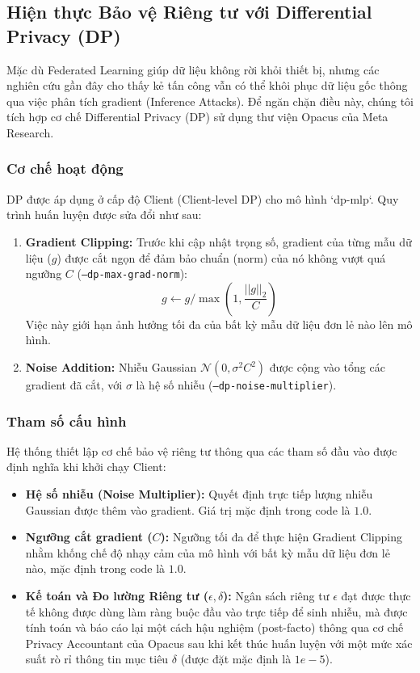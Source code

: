 \subsection{Hiện thực Bảo vệ Riêng tư với Differential Privacy (DP)}

Mặc dù Federated Learning giúp dữ liệu không rời khỏi thiết bị, nhưng các nghiên cứu gần đây cho thấy kẻ tấn công vẫn có thể khôi phục dữ liệu gốc thông qua việc phân tích gradient (Inference Attacks). Để ngăn chặn điều này, chúng tôi tích hợp cơ chế Differential Privacy (DP) sử dụng thư viện Opacus của Meta Research.

\subsubsection{Cơ chế hoạt động}
DP được áp dụng ở cấp độ Client (Client-level DP) cho mô hình `dp-mlp`. Quy trình huấn luyện được sửa đổi như sau:
\begin{enumerate}
    \item \textbf{Gradient Clipping:} Trước khi cập nhật trọng số, gradient của từng mẫu dữ liệu ($g$) được cắt ngọn để đảm bảo chuẩn (norm) của nó không vượt quá ngưỡng $C$ (\texttt{--dp-max-grad-norm}):
    $$g \leftarrow g / \max(1, \frac{||g||_2}{C})$$
    Việc này giới hạn ảnh hưởng tối đa của bất kỳ mẫu dữ liệu đơn lẻ nào lên mô hình.
    
    \item \textbf{Noise Addition:} Nhiễu Gaussian $\mathcal{N}(0, \sigma^2C^2)$ được cộng vào tổng các gradient đã cắt, với $\sigma$ là hệ số nhiễu (\texttt{--dp-noise-multiplier}).
\end{enumerate}



\subsubsection{Tham số cấu hình}
Hệ thống thiết lập cơ chế bảo vệ riêng tư thông qua các tham số đầu vào được định nghĩa khi khởi chạy Client:

\begin{itemize}
    \item \textbf{Hệ số nhiễu (Noise Multiplier):} Quyết định trực tiếp lượng nhiễu Gaussian được thêm vào gradient. Giá trị mặc định trong code là $1.0$.
    \item \textbf{Ngưỡng cắt gradient ($C$):} Ngưỡng tối đa để thực hiện Gradient Clipping nhằm khống chế độ nhạy cảm của mô hình với bất kỳ mẫu dữ liệu đơn lẻ nào, mặc định trong code là $1.0$.
    \item \textbf{Kế toán và Đo lường Riêng tư ($\epsilon, \delta$):} Ngân sách riêng tư $\epsilon$ đạt được thực tế không được dùng làm ràng buộc đầu vào trực tiếp để sinh nhiễu, mà được tính toán và báo cáo lại một cách hậu nghiệm (post-facto) thông qua cơ chế Privacy Accountant của Opacus sau khi kết thúc huấn luyện với một mức xác suất rò rỉ thông tin mục tiêu $\delta$ (được đặt mặc định là $1e-5$).
\end{itemize}

